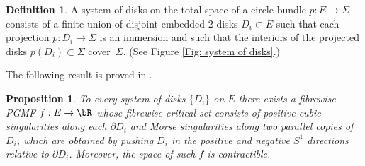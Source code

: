 \documentclass[JEP,XML,SOM,Unicode,NoFloatCountersInSection]{cedram}
\theoremstyle{plain}
\newtheorem{proposition}[theorem]{Proposition}
\theoremstyle{definition}
\newtheorem{definition}[theorem]{Definition}
\begin{document}
\begin{definition}
A system of disks on the total space of a circle bundle \hbox{$p:E\!\to\!\Sigma$} consists of a finite union of disjoint embedded $2$-disks $D_i \subset E$ such that each projection \hbox{$p:D_i \to \Sigma$} is an immersion and such that the interiors of the projected disks \hbox{$p(D_i) \subset \Sigma$} cover~$\Sigma$. (See Figure \ref{Fig: system of disks}.)
\end{definition}

The following result is proved in \cite{IK93}.

\begin{proposition}\label{systems}
To every system of disks $\{ D_i \}$ on $E$ there exists a fibrewise PGMF $f:E \to \bR$ whose fibrewise critical set consists of positive cubic singularities along each $\partial D_i$ and Morse singularities along two parallel copies of $D_i$, which are obtained by pushing $D_i$ in the positive and negative $S^1$ directions relative to $\partial D_i$. Moreover, the space of such $f$ is contractible.
\end{proposition}
\end{document}
